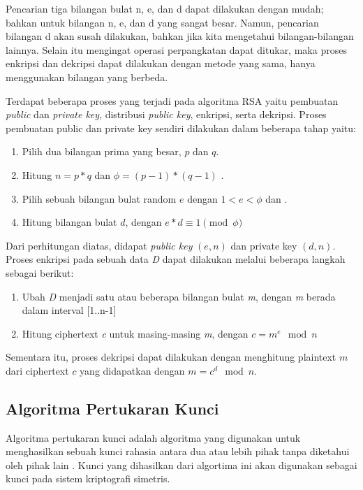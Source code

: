     Pencarian tiga bilangan bulat n, e, dan d dapat dilakukan dengan mudah; bahkan untuk bilangan n, e, dan d yang sangat besar. Namun, pencarian bilangan d akan susah dilakukan, bahkan jika kita mengetahui bilangan-bilangan lainnya. Selain itu mengingat operasi perpangkatan dapat ditukar, maka proses enkripsi dan dekripsi dapat dilakukan dengan metode yang sama, hanya menggunakan bilangan yang berbeda.

    Terdapat beberapa proses yang terjadi pada algoritma RSA yaitu pembuatan \textit{public} dan \textit{private key}, distribusi \textit{public key}, enkripsi, serta dekripsi. Proses pembuatan public dan private key sendiri dilakukan dalam beberapa tahap yaitu:

    \begin{enumerate}
      \item Pilih dua bilangan prima yang besar, $p$ dan $q$.
      \item Hitung $n = p*q$ dan $ \phi = (p-1)*(q-1)$ .
      \item Pilih sebuah bilangan bulat random $e$ dengan $ 1 < e < \phi$ dan .
      \item Hitung bilangan bulat $d$, dengan $ e*d  \equiv  1 \pmod{\phi} $
    \end{enumerate}

    Dari perhitungan diatas, didapat \textit{public key} $(e, n)$ dan private key $(d, n)$.
    Proses enkripsi pada sebuah data \textit{D} dapat dilakukan melalui beberapa langkah sebagai berikut:
    \begin{enumerate}
      \item Ubah \textit{D} menjadi satu atau beberapa bilangan bulat \textit{m}, dengan \textit{m} berada dalam interval [1..n-1]
      \item Hitung ciphertext \textit{c} untuk masing-masing \textit{m}, dengan $c = m^e \mod n $
    \end{enumerate}

    Sementara itu, proses dekripsi dapat dilakukan dengan menghitung plaintext $m$ dari ciphertext $c$ yang didapatkan dengan $m = c^d \mod n$.


  \subsection{Algoritma Pertukaran Kunci}
  Algoritma pertukaran kunci adalah algoritma yang digunakan untuk menghasilkan sebuah kunci rahasia antara dua atau lebih pihak tanpa diketahui oleh pihak lain \citep{applied_crypto}. Kunci yang dihasilkan dari algortima ini akan digunakan sebagai kunci pada sistem kriptografi simetris.

